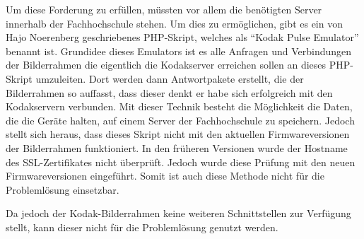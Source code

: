\begin{flushleft}
Um diese Forderung zu erfüllen, müssten vor allem die benötigten Server innerhalb der Fachhochschule stehen. Um dies zu ermöglichen, gibt es ein von Hajo Noerenberg geschriebenes PHP-Skript, welches als ``Kodak Pulse Emulator'' benannt ist. Grundidee dieses Emulators ist es alle Anfragen und Verbindungen der Bilderrahmen die eigentlich die Kodakserver erreichen sollen an dieses PHP-Skript umzuleiten. Dort werden dann Antwortpakete erstellt, die der Bilderrahmen so auffasst, dass dieser denkt er habe sich erfolgreich mit den Kodakservern verbunden. Mit dieser Technik besteht die Möglichkeit die Daten, die die Geräte halten, auf einem Server der Fachhochschule zu speichern. 
Jedoch stellt sich heraus, dass dieses Skript nicht mit den aktuellen Firmwareversionen der Bilderrahmen funktioniert. In den früheren Versionen wurde der Hostname des SSL-Zertifikates nicht überprüft. Jedoch wurde diese Prüfung mit den neuen Firmwareversionen eingeführt. Somit ist auch diese Methode nicht für die Problemlösung einsetzbar. 

Da jedoch der Kodak-Bilderrahmen keine weiteren Schnittstellen zur Verfügung stellt, kann dieser nicht für die Problemlösung genutzt werden. 
\end{flushleft}

% 

